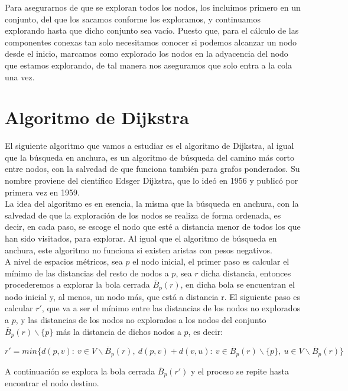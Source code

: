Para asegurarnos de que se exploran todos los nodos, los incluimos primero en un conjunto, del que los sacamos conforme los exploramos, y continuamos explorando hasta que dicho conjunto sea vacío. Puesto que, para el cálculo de las componentes conexas tan solo necesitamos conocer si podemos alcanzar un nodo desde el inicio, marcamos como explorado los nodos en la adyacencia del nodo que estamos explorando, de tal manera nos aseguramos que solo entra a la cola una vez. 

\section{Algoritmo de Dijkstra}\label{DJK}

El siguiente algoritmo que vamos a estudiar es el algoritmo de Dijkstra, al igual que la búsqueda en anchura, es un algoritmo de búsqueda del camino más corto entre nodos, con la salvedad de que funciona también para grafos ponderados. Su nombre proviene del científico Edsger Dijkstra, que lo ideó en 1956 y publicó por primera vez en 1959. \\

La idea del algoritmo es en esencia, la misma que la búsqueda en anchura, con la salvedad de que la exploración de los nodos se realiza de forma ordenada, es decir, en cada paso, se escoge el nodo que esté a distancia menor de todos los que han sido visitados, para explorar. Al igual que el algoritmo de búsqueda en anchura, este algoritmo no funciona si existen aristas con pesos negativos. \\

A nivel de espacios métricos, sea $p$ el nodo inicial, el primer paso es calcular el mínimo de las distancias del resto de nodos a $p$, sea $r$ dicha distancia, entonces procederemos a explorar la bola cerrada $\overline B_p(r)$, en dicha bola se encuentran el nodo inicial y, al menos, un nodo más, que está a distancia r. El siguiente paso es calcular $r'$, que va a ser el mínimo entre las distancias de los nodos no explorados a $p$, y las distancias de los nodos no explorados a los nodos del conjunto $\overline B_p(r)\backslash\{p\}$ más la distancia de dichos nodos a $p$, es decir:

$$r' = min\{d(p,v):\ v \in V\backslash\overline B_p(r),\ d(p,v) + d(v,u):\ v \in \overline B_p(r)\backslash\{p\},\ u \in V\backslash\overline B_p(r)\}$$

A continuación se explora la bola cerrada $\overline B_p(r')$ y el proceso se repite hasta encontrar el nodo destino.

